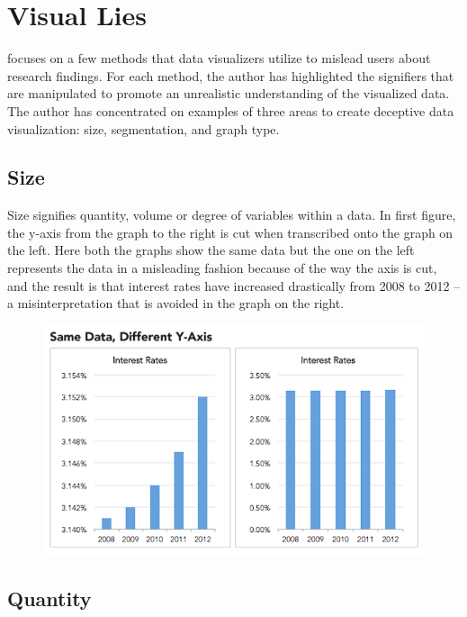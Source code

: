 \documentclass[]{book}
\theoremstyle{definition}
\theoremstyle{definition}
\theoremstyle{definition}
\theoremstyle{remark}
\begin{document}
\section{Visual Lies}\label{visual-lies}

\citep{visual-lies} focuses on a few methods that data visualizers
utilize to mislead users about research findings. For each method, the
author has highlighted the signifiers that are manipulated to promote an
unrealistic understanding of the visualized data. The author has
concentrated on examples of three areas to create deceptive data
visualization: size, segmentation, and graph type.

\subsection{Size}\label{size}

Size signifies quantity, volume or degree of variables within a data. In
first figure, the y-axis from the graph to the right is cut when
transcribed onto the graph on the left. Here both the graphs show the
same data but the one on the left represents the data in a misleading
fashion because of the way the axis is cut, and the result is that
interest rates have increased drastically from 2008 to 2012 -- a
misinterpretation that is avoided in the graph on the right.

\begin{figure}
\centering
\includegraphics{images/Size1.png}
\caption{}
\end{figure}

\subsection{Quantity}\label{quantity}
\end{document}

